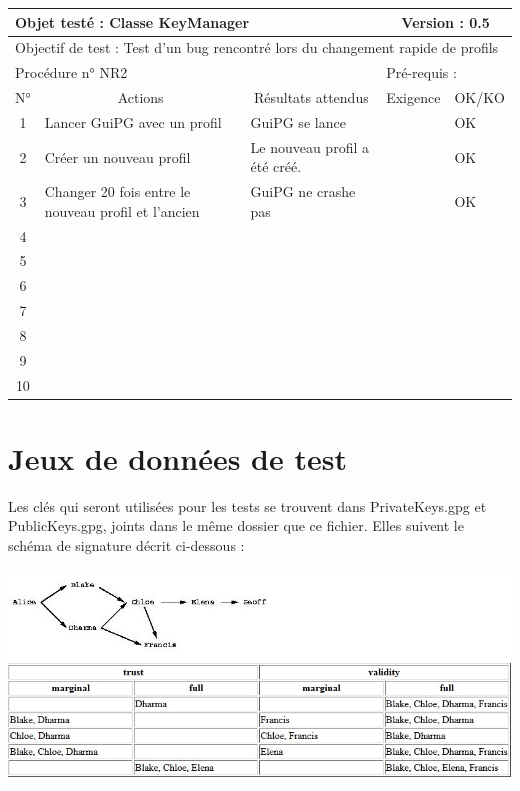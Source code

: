 \documentclass{../res/univ-projet}
\begin{document}
\begin{center}
    \begin{tabular}{|c|p{5cm}|p{5cm}|p{1.5cm}|p{1.5cm}|}
      \hline
      \multicolumn{3}{|l|}{Objet testé : Classe KeyManager} & \multicolumn{2}{c|}{Version : 0.5}\\ \hline
      \multicolumn{5}{|l|}{Objectif de test : Test d'un bug rencontré lors du changement rapide de profils}\\ \hline
      \multicolumn{3}{|l|}{Procédure n° NR2} & \multicolumn{2}{p{3cm}|}{Pré-requis : }\\ \hline
      \multicolumn{1}{|c|}{N°} & \multicolumn{1}{c|}{Actions} & \multicolumn{1}{c|}{Résultats attendus} & 
      \multicolumn{1}{c|}{Exigence} & \multicolumn{1}{c|}{OK/KO}\\ \hline
      1 & Lancer GuiPG avec un profil & GuiPG se lance &  & OK \\
      2 & Créer un nouveau profil & Le nouveau profil a été créé. &  & OK \\
      3 & Changer 20 fois entre le nouveau profil et l'ancien & GuiPG ne crashe pas &  & OK \\
      4 &  &  &  & \\
      5 &  &  &  & \\
      6 &  &  &  & \\
      7 &  &  &  & \\
      8 &  &  &  & \\
      9 &  &  &  & \\
      10 &  &  &  &\\ 
  \hline
    \end{tabular}
    \vskip 2.2cm
    
\end{center}

\section{Jeux de données de test}

Les clés qui seront utilisées pour les tests se trouvent dans PrivateKeys.gpg et PublicKeys.gpg, joints dans le même dossier que ce fichier.
Elles suivent le schéma de signature décrit ci-dessous :

\includegraphics[scale=0.80]{graphics/trust_example.png}
\end{document}

